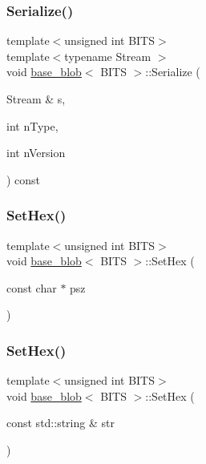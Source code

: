 \mbox{\label{classbase__blob_a139e37d05d7f40a39497485a4b8301dc}} 
\subsubsection{\texorpdfstring{Serialize()}{Serialize()}}
{\footnotesize\ttfamily template$<$unsigned int B\+I\+TS$>$ \\
template$<$typename Stream $>$ \\
void \mbox{\hyperlink{classbase__blob}{base\+\_\+blob}}$<$ B\+I\+TS $>$\+::Serialize (\begin{DoxyParamCaption}\item[{Stream \&}]{s,  }\item[{int}]{n\+Type,  }\item[{int}]{n\+Version }\end{DoxyParamCaption}) const\hspace{0.3cm}{\ttfamily [inline]}}

\mbox{\label{classbase__blob_a5ec1f681a2830f4e180fe664c0eb4dd0}} 
\subsubsection{\texorpdfstring{Set\+Hex()}{SetHex()}\hspace{0.1cm}{\footnotesize\ttfamily [1/2]}}
{\footnotesize\ttfamily template$<$unsigned int B\+I\+TS$>$ \\
void \mbox{\hyperlink{classbase__blob}{base\+\_\+blob}}$<$ B\+I\+TS $>$\+::Set\+Hex (\begin{DoxyParamCaption}\item[{const char $\ast$}]{psz }\end{DoxyParamCaption})}

\mbox{\label{classbase__blob_a5df0a1d46bdf167b4e2dc7c7068ff53a}} 
\subsubsection{\texorpdfstring{Set\+Hex()}{SetHex()}\hspace{0.1cm}{\footnotesize\ttfamily [2/2]}}
{\footnotesize\ttfamily template$<$unsigned int B\+I\+TS$>$ \\
void \mbox{\hyperlink{classbase__blob}{base\+\_\+blob}}$<$ B\+I\+TS $>$\+::Set\+Hex (\begin{DoxyParamCaption}\item[{const std\+::string \&}]{str }\end{DoxyParamCaption})}

